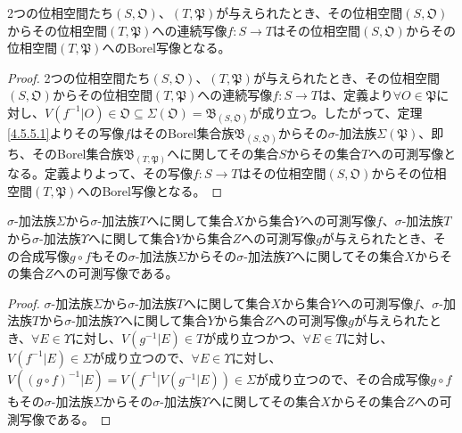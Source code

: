 \documentclass[dvipdfmx]{jsarticle}
\begin{document}
\begin{thm}\label{4.5.5.2}
2つの位相空間たち$\left( S,\mathfrak{O} \right)$、$\left( T,\mathfrak{P} \right)$が与えられたとき、その位相空間$\left( S,\mathfrak{O} \right)$からその位相空間$\left( T,\mathfrak{P} \right)$への連続写像$f:S \rightarrow T$はその位相空間$\left( S,\mathfrak{O} \right)$からその位相空間$\left( T,\mathfrak{P} \right)$へのBorel写像となる。
\end{thm}
\begin{proof}
2つの位相空間たち$\left( S,\mathfrak{O} \right)$、$\left( T,\mathfrak{P} \right)$が与えられたとき、その位相空間$\left( S,\mathfrak{O} \right)$からその位相空間$\left( T,\mathfrak{P} \right)$への連続写像$f:S \rightarrow T$は、定義より$\forall O \in \mathfrak{P}$に対し、$V\left( f^{- 1}|O \right)\in \mathfrak{O \subseteq}\varSigma\left( \mathfrak{O} \right) = \mathfrak{B}_{\left( S,\mathfrak{O} \right)}$が成り立つ。したがって、定理\ref{4.5.5.1}よりその写像$f$はそのBorel集合族$\mathfrak{B}_{\left( S,\mathfrak{O} \right)}$からその$\sigma$-加法族$\varSigma\left( \mathfrak{P} \right)$、即ち、そのBorel集合族$\mathfrak{B}_{\left( T,\mathfrak{P} \right)}$へに関してその集合$S$からその集合$T$への可測写像となる。定義よりよって、その写像$f:S \rightarrow T$はその位相空間$\left( S,\mathfrak{O} \right)$からその位相空間$\left( T,\mathfrak{P} \right)$へのBorel写像となる。
\end{proof}
\begin{thm}\label{4.5.5.3}
$\sigma$-加法族$\varSigma$から$\sigma$-加法族$T$へに関して集合$X$から集合$Y$への可測写像$f$、$\sigma$-加法族$T$から$\sigma$-加法族$\varUpsilon$へに関して集合$Y$から集合$Z$への可測写像$g$が与えられたとき、その合成写像$g \circ f$もその$\sigma$-加法族$\varSigma$からその$\sigma$-加法族$\varUpsilon$へに関してその集合$X$からその集合$Z$への可測写像である。
\end{thm}
\begin{proof}
$\sigma$-加法族$\varSigma$から$\sigma$-加法族$T$へに関して集合$X$から集合$Y$への可測写像$f$、$\sigma$-加法族$T$から$\sigma$-加法族$\varUpsilon$へに関して集合$Y$から集合$Z$への可測写像$g$が与えられたとき、$\forall E \in \varUpsilon$に対し、$V\left( g^{- 1}|E \right) \in T$が成り立つかつ、$\forall E \in T$に対し、$V\left( f^{- 1}|E \right) \in \varSigma$が成り立つので、$\forall E \in \varUpsilon$に対し、$V\left( (g \circ f)^{- 1}|E \right) = V\left( f^{- 1}|V\left( g^{- 1}|E \right) \right) \in \varSigma$が成り立つので、その合成写像$g \circ f$もその$\sigma$-加法族$\varSigma$からその$\sigma$-加法族$\varUpsilon$へに関してその集合$X$からその集合$Z$への可測写像である。
\end{proof}
\end{document}

